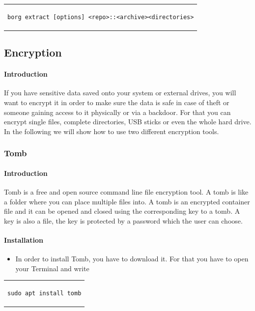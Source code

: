 \documentclass[a4paper,10pt]{article}
\begin{document}
\begin{center}
\begin{tabular}{c}
\begin{lstlisting}
borg extract [options] <repo>::<archive><directories>
\end{lstlisting}
\end{tabular}
\end{center}

\subsection{Encryption}

\paragraph{Introduction}
If you have sensitive data saved onto your system or external drives, you will want to encrypt it in order to make sure the data is safe in case of theft or someone gaining access to it physically or via a backdoor. For that you can encrypt single files, complete directories, USB sticks or even the whole hard drive. In the following we will show how to use two different encryption tools.


\subsubsection{Tomb}

\paragraph{Introduction}
Tomb is a free and open source command line file encryption tool. A tomb is like a folder where you can place multiple files into. A tomb is an encrypted container file and it can be opened and closed using the corresponding key to a tomb. A key is also a file, the key is protected by a password which the user can choose.

\paragraph{Installation}

\begin{itemize}[leftmargin=*]
\item In order to install Tomb, you have to download it. For that you have to open your Terminal and write 
\end{itemize}

\begin{center}
\begin{tabular}{c}
\begin{lstlisting}
sudo apt install tomb
\end{lstlisting}
\end{tabular}
\end{center}
\end{document}
